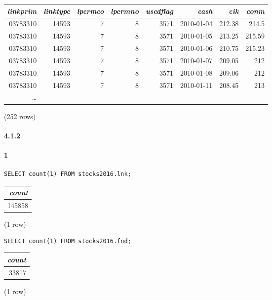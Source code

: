 \documentclass[]{article}
\let\oldparagraph\paragraph
\renewcommand{\paragraph}[1]{\oldparagraph{#1}\mbox{}}
\begin{document}
\begin{center}
\begin{tabular}{r | r | r | r | r | r | r | r}
\textit{linkprim} & \textit{linktype} & \textit{lpermco} & \textit{lpermno} & \textit{usedflag} & \textit{cash} & \textit{cik} & \textit{conm}  \\
\hline
03783310 & 14593 & 7 & 8 & 3571 & 2010-01-04 & 212.38 & 214.5 \\
03783310 & 14593 & 7 & 8 & 3571 & 2010-01-05 & 213.25 & 215.59  \\
03783310 & 14593 & 7 & 8 & 3571 & 2010-01-06 & 210.75 & 215.23 \\
03783310 & 14593 & 7 & 8 & 3571 & 2010-01-07 & 209.05 & 212 \\
03783310 & 14593 & 7 & 8 & 3571 & 2010-01-08 & 209.06 & 212  \\
03783310 & 14593 & 7 & 8 & 3571 & 2010-01-11 & 208.45 & 213 \\
\ldots
\end{tabular}

\noindent (252 rows) \\
\end{center}

\paragraph{4.1.2}

\paragraph{1} 

\color{blue}
\begin{verbatim}
SELECT count(1) FROM stocks2016.lnk;
\end{verbatim}
\color{black}

\begin{center}
\begin{tabular}{r}
\textit{count} \\
\hline
145858 \\
\end{tabular}

\noindent (1 row) \\
\end{center}

\color{blue}
\begin{verbatim}
SELECT count(1) FROM stocks2016.fnd;
\end{verbatim}
\color{black}

\begin{center}
\begin{tabular}{r}
\textit{count} \\
\hline
33817 \\
\end{tabular}

\noindent (1 row) \\
\end{center}
\end{document}
